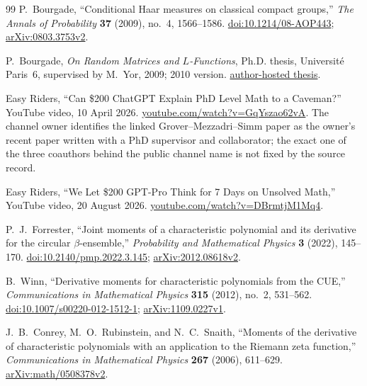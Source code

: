 \begin{thebibliography}{99}
P.~Bourgade,
``Conditional Haar measures on classical compact groups,''
\emph{The Annals of Probability} \textbf{37} (2009), no.~4, 1566--1586.
\href{https://doi.org/10.1214/08-AOP443}{doi:10.1214/08-AOP443};
\href{https://arxiv.org/abs/0803.3753v2}{arXiv:0803.3753v2}.

P.~Bourgade,
\emph{On Random Matrices and $L$-Functions},
Ph.D. thesis, Universit\'e Paris~6, supervised by M.~Yor, 2009; 2010 version.
\href{https://math.nyu.edu/~bourgade/papers/PhDThesis.pdf}{author-hosted thesis}.

Easy Riders,
\textquotedblleft{}Can \$200 ChatGPT Explain PhD Level Math to a Caveman?''
YouTube video, 10 April 2026.
\href{https://www.youtube.com/watch?v=GqYszao62vA}{youtube.com/watch?v=GqYszao62vA}.
The channel owner identifies the linked Grover--Mezzadri--Simm paper as the owner's recent
paper written with a PhD supervisor and collaborator; the exact one of the three coauthors
behind the public channel name is not fixed by the source record.

Easy Riders,
\textquotedblleft{}We Let \$200 GPT-Pro Think for 7 Days on Unsolved Math,''
YouTube video, 20 August 2026.
\href{https://www.youtube.com/watch?v=DBrmtjM1Mq4}{youtube.com/watch?v=DBrmtjM1Mq4}.

P.~J.~Forrester,
\textquotedblleft{}Joint moments of a characteristic polynomial and its derivative for the
circular $\beta$-ensemble,''
\emph{Probability and Mathematical Physics} \textbf{3} (2022), 145--170.
\href{https://doi.org/10.2140/pmp.2022.3.145}{doi:10.2140/pmp.2022.3.145};
\href{https://arxiv.org/abs/2012.08618v2}{arXiv:2012.08618v2}.

B.~Winn,
\textquotedblleft{}Derivative moments for characteristic polynomials from the CUE,''
\emph{Communications in Mathematical Physics} \textbf{315} (2012), no.~2, 531--562.
\href{https://doi.org/10.1007/s00220-012-1512-1}{doi:10.1007/s00220-012-1512-1};
\href{https://arxiv.org/abs/1109.0227v1}{arXiv:1109.0227v1}.

J.~B.~Conrey, M.~O.~Rubinstein, and N.~C.~Snaith,
\textquotedblleft{}Moments of the derivative of characteristic polynomials with an
application to the Riemann zeta function,''
\emph{Communications in Mathematical Physics} \textbf{267} (2006), 611--629.
\href{https://arxiv.org/abs/math/0508378v2}{arXiv:math/0508378v2}.


\end{thebibliography}
